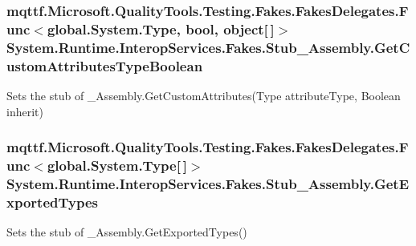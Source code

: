 \hypertarget{class_system_1_1_runtime_1_1_interop_services_1_1_fakes_1_1_stub___assembly_ad793f0ad8235534611a7b7b73130ee59}{
\subsubsection[{Get\-Custom\-Attributes\-Type\-Boolean}]{\setlength{\rightskip}{0pt plus 5cm}mqttf.\-Microsoft.\-Quality\-Tools.\-Testing.\-Fakes.\-Fakes\-Delegates.\-Func$<$global.\-System.\-Type, bool, object\mbox{[}$\,$\mbox{]}$>$ System.\-Runtime.\-Interop\-Services.\-Fakes.\-Stub\-\_\-\-Assembly.\-Get\-Custom\-Attributes\-Type\-Boolean}}\label{class_system_1_1_runtime_1_1_interop_services_1_1_fakes_1_1_stub___assembly_ad793f0ad8235534611a7b7b73130ee59}


Sets the stub of \-\_\-\-Assembly.\-Get\-Custom\-Attributes(\-Type attribute\-Type, Boolean inherit)

\hypertarget{class_system_1_1_runtime_1_1_interop_services_1_1_fakes_1_1_stub___assembly_aff0f6f1aca039ee26cc94426beb5d251}{
\subsubsection[{Get\-Exported\-Types}]{\setlength{\rightskip}{0pt plus 5cm}mqttf.\-Microsoft.\-Quality\-Tools.\-Testing.\-Fakes.\-Fakes\-Delegates.\-Func$<$global.\-System.\-Type\mbox{[}$\,$\mbox{]}$>$ System.\-Runtime.\-Interop\-Services.\-Fakes.\-Stub\-\_\-\-Assembly.\-Get\-Exported\-Types}}\label{class_system_1_1_runtime_1_1_interop_services_1_1_fakes_1_1_stub___assembly_aff0f6f1aca039ee26cc94426beb5d251}


Sets the stub of \-\_\-\-Assembly.\-Get\-Exported\-Types()

